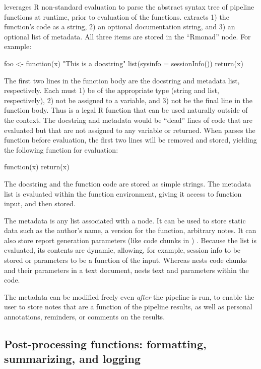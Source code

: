  leverages R non-standard evaluation to parse the abstract
syntax tree of pipeline functions at runtime, prior to evaluation of the
functions.  extracts 1) the function's code as a string, 2) an
optional documentation string, and 3) an optional list of metadata.
All three items are stored in the ``Rmonad'' node. For example:
%
\begin{example}
foo <- function(x){
  "This is a docstring"
  list(sysinfo = sessionInfo())
  return(x)
}
\end{example}
%
\noindent
The first two lines in the function body are the docstring and metadata list,
respectively. Each must 1) be of the appropriate type (string and list,
respectively), 2) not be assigned to a variable, and 3) not be the final line
in the function body. Thus  is a legal R function that can be used
naturally outside of the  context. The docstring and metadata
would be ``dead'' lines of code that are evaluated but that are not assigned to
any variable or returned. When  parses the function before
evaluation, the first two lines will be removed and stored, yielding the following
function for evaluation:
%
\begin{example}
function(x){
  return(x)
}
\end{example}

The docstring and the function code are stored as simple strings. The metadata
list is evaluated within the function environment, giving it access to function
input, and then stored.

The metadata is any list associated with a node. It can be used to
store static data such as the author's name, a version for the function,
arbitrary notes. It can also store report generation parameters (like code
chunks in ) \citep{knitr}. Because the list is evaluated, its
contents are dynamic, allowing, for example, session info to be stored or
 parameters to be a function of the input. Whereas
 nests code chunks and their parameters in a text document,
 nests text and parameters within the code.

The metadata can be modified freely even \emph{after} the pipeline is run, to
enable the user to store notes that are a function of the pipeline results, as well as
personal annotations, reminders, or comments on the results.


\subsection{Post-processing functions: formatting, summarizing, and logging}

